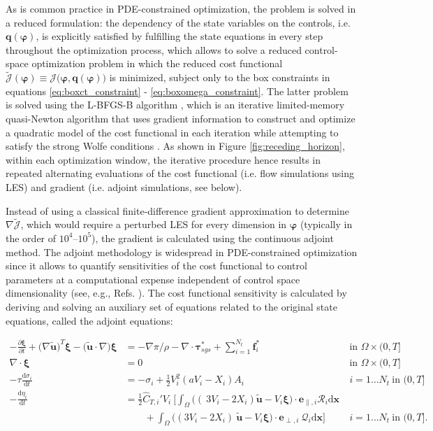 \documentclass[energies,article,submit,moreauthors,latex,10pt,a4paper]{mdpi}
\newcommand{\bs}[1]{\boldsymbol{#1}}
\newcommand{\dx}{\text{d}\boldsymbol{x}}
\newcommand{\ddt}[1]{\frac{\text{d} #1}{\text{d} t}}
\newcommand{\sint}{\int_{\Omega}}
\newcommand{\utilde}{\widetilde{\bs{u}}}
\newcommand{\ctihat}{\widehat{C}_{T,i}'}
\newcommand{\R}{\mathscr{R}}
\newcommand{\J}{\mathscr{J}}
\newcommand{\eperpi}{\bs{e}_{\perp,i}}
\begin{document}
As is common practice in PDE-constrained optimization, the problem is solved in a reduced formulation: the dependency of the state variables on the controls, i.e. $\bs{q}(\bs{\varphi})$, is explicitly satisfied by fulfilling the state equations in every step throughout the optimization process, which allows to solve a reduced control-space optimization problem in which the reduced cost functional $\tilde{\J}(\bs{\varphi}) \equiv \J \big(\bs{\varphi},\bs{q}(\bs{\varphi}) \big)$ is minimized, subject only to the box constraints in equations \eqref{eq:boxct_constraint} - \eqref{eq:boxomega_constraint}. The latter problem is solved using the L-BFGS-B algorithm \cite{byrd1995limited}, which is an iterative limited-memory quasi-Newton algorithm that uses gradient information to construct and optimize a quadratic model of the cost functional in each iteration while attempting to satisfy the strong Wolfe conditions \cite{wolfe1969convergence}. As shown in Figure \ref{fig:receding_horizon}, within each optimization window, the iterative procedure hence results in repeated alternating evaluations of the cost functional (i.e. flow simulations using LES) and gradient (i.e. adjoint simulations, see below).

Instead of using a classical finite-difference gradient approximation to determine $\nabla \tilde{\J}$, which would require a perturbed LES for every dimension in $\bs{\varphi}$ (typically in the order of $10^4$--$10^5$), the gradient is calculated using the continuous adjoint method. The adjoint methodology is widespread in PDE-constrained optimization since it allows to quantify sensitivities of the cost functional to control parameters at a computational expense independent of control space dimensionality (see, e.g., Refs. \cite{jameson1988aerodynamic,giles2000introduction,troltzsch,borzinschulz}). The cost functional sensitivity is calculated by deriving and solving an auxiliary set of equations related to the original state equations, called the adjoint equations:
 
{\small
\begin{align}
- \frac{\partial \bs{\xi}}{\partial t} + \big( \nabla \utilde \big)^T \bs{\xi} - \big( \utilde \cdot \nabla \big) \bs{\xi} &= - \nabla \pi / \rho - \nabla \cdot \boldsymbol{\tau}^*_{sgs} + \sum_{i=1}^{N_t} \bs{f}_i^* & \text{in } \Omega \times (0,T] \label{eq:adjoint_momentum}\\
\nabla \cdot \bs{\xi} &= 0 & \text{in } \Omega \times (0,T]\label{eq:adjoint_continuity}\\
-\tau \ddt{\sigma_i} &= -\sigma_i + \frac{1}{2} V_i^2  (a V_i - X_i) A_i  &  i=1\dots N_t~\text{in } (0,T] \label{eq:adjoint_sigma}\\
- \ddt{\eta_i} &= \frac{1}{2} \ctihat V_i ~ \Bigg[ \int_{\Omega} \bigg((~3 V_i - 2 X_i ) \utilde - V_i \bs{\xi} 
\bigg) \cdot \bs{e}_{\parallel,i} \R_i \dx ~ \nonumber \\
& \qquad + \sint \bigg( (3 V_i - 2 X_i )~\utilde - V_i \bs{\xi} \bigg) \cdot \eperpi ~ \mathscr{Q}_i  \dx \Bigg] &  i=1\dots N_t~\text{in } (0,T] \label{eq:adjoint_eta}.
\end{align}
}
\end{document}
